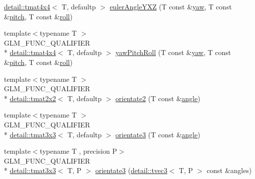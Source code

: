 \begin{DoxyCompactItemize}
\hyperlink{structglm_1_1detail_1_1tmat4x4}{detail\-::tmat4x4}$<$ T, defaultp $>$ \hyperlink{group__gtx__euler__angles_gab9bc80f4f579efd8f0d161e8b58ff452}{euler\-Angle\-Y\-X\-Z} (T const \&\hyperlink{group__gtc__quaternion_ga1de7653ddf380ff06d2300eea831664c}{yaw}, T const \&\hyperlink{group__gtc__quaternion_ga4d345dc369a54f53f5ebc375bac56d11}{pitch}, T const \&\hyperlink{group__gtc__quaternion_ga6d883e423bc425f4334fcce202131f7e}{roll})
\item 
{\footnotesize template$<$typename T $>$ }\\G\-L\-M\-\_\-\-F\-U\-N\-C\-\_\-\-Q\-U\-A\-L\-I\-F\-I\-E\-R \\*
\hyperlink{structglm_1_1detail_1_1tmat4x4}{detail\-::tmat4x4}$<$ T, defaultp $>$ \hyperlink{group__gtx__euler__angles_gaf6f927d06835272cd6a61ee3f8f65f5e}{yaw\-Pitch\-Roll} (T const \&\hyperlink{group__gtc__quaternion_ga1de7653ddf380ff06d2300eea831664c}{yaw}, T const \&\hyperlink{group__gtc__quaternion_ga4d345dc369a54f53f5ebc375bac56d11}{pitch}, T const \&\hyperlink{group__gtc__quaternion_ga6d883e423bc425f4334fcce202131f7e}{roll})
\item 
{\footnotesize template$<$typename T $>$ }\\G\-L\-M\-\_\-\-F\-U\-N\-C\-\_\-\-Q\-U\-A\-L\-I\-F\-I\-E\-R \\*
\hyperlink{structglm_1_1detail_1_1tmat2x2}{detail\-::tmat2x2}$<$ T, defaultp $>$ \hyperlink{group__gtx__euler__angles_gab39476f0decc117783e02ba389a04ee7}{orientate2} (T const \&\hyperlink{group__gtc__quaternion_ga23a3fc7ada5bbb665ff84c92c6e0542c}{angle})
\item 
{\footnotesize template$<$typename T $>$ }\\G\-L\-M\-\_\-\-F\-U\-N\-C\-\_\-\-Q\-U\-A\-L\-I\-F\-I\-E\-R \\*
\hyperlink{structglm_1_1detail_1_1tmat3x3}{detail\-::tmat3x3}$<$ T, defaultp $>$ \hyperlink{group__gtx__euler__angles_ga2c94907d441c40beb413fe3284c1b267}{orientate3} (T const \&\hyperlink{group__gtc__quaternion_ga23a3fc7ada5bbb665ff84c92c6e0542c}{angle})
\item 
{\footnotesize template$<$typename T , precision P$>$ }\\G\-L\-M\-\_\-\-F\-U\-N\-C\-\_\-\-Q\-U\-A\-L\-I\-F\-I\-E\-R \\*
\hyperlink{structglm_1_1detail_1_1tmat3x3}{detail\-::tmat3x3}$<$ T, P $>$ \hyperlink{group__gtx__euler__angles_gab6a2a986916647ddedc94bbd2516f20c}{orientate3} (\hyperlink{structglm_1_1detail_1_1tvec3}{detail\-::tvec3}$<$ T, P $>$ const \&angles)
\item 

\end{DoxyCompactItemize}
